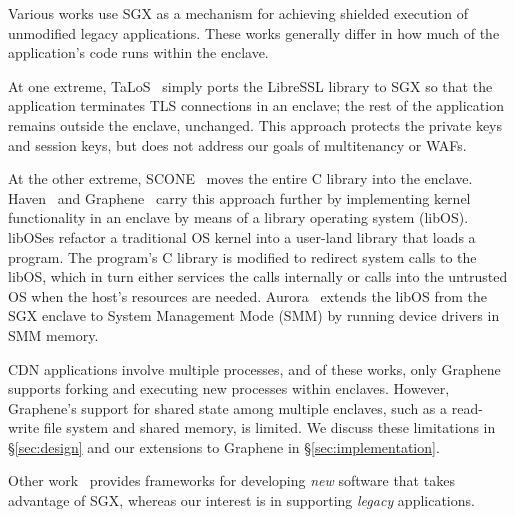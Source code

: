 Various works use SGX as a mechanism for achieving shielded execution of
unmodified legacy applications.
%
These works generally differ in how much of the application's code runs
within the enclave.


At one extreme, TaLoS~\cite{talos} simply ports the LibreSSL library to SGX so
that the application terminates TLS connections in an enclave; the rest of
the application remains outside the enclave, unchanged.
%
This approach protects the private keys and session
keys, but does not address our goals of multitenancy or WAFs.


At the other extreme, SCONE~\cite{scone} moves the entire C library into the enclave.
%
Haven~\cite{haven} and Graphene~\cite{graphene} carry this approach further by
implementing kernel functionality in an enclave by means of a library operating
system (libOS).
libOSes refactor a traditional OS kernel into a user-land library that loads a
program.
%
The program's C library is modified to redirect system calls to the libOS, which
in turn either services the calls internally or calls into the untrusted OS
when the host's resources are needed.
%
Aurora~\cite{liang2018aurora} extends the libOS from the SGX enclave to System
Management Mode (SMM) by running device drivers in SMM memory.


CDN applications involve multiple processes, and of these works, only Graphene
supports forking and executing new processes within enclaves.
%
However, Graphene's support for shared state among multiple enclaves, such as a
read-write file system and shared memory, is limited.
%
We discuss these limitations in \S\ref{sec:design} and our extensions to
Graphene in \S\ref{sec:implementation}.


Other work~\cite{beekman2016improving} provides
frameworks for developing \emph{new} software that takes advantage of SGX,
whereas our interest is in supporting \emph{legacy} applications.



